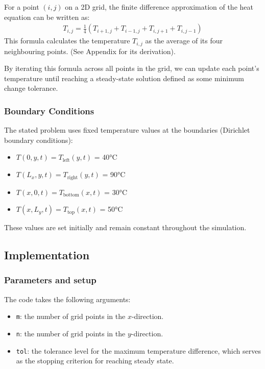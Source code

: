 \documentclass[11pt,a4paper]{article}
\begin{document}
For a point \((i, j)\) on a 2D grid,
the finite difference approximation of the heat equation can be written as:
\begin{align}
  T_{i,j} = \frac{1}{4}\left(T_{i+1,j} + T_{i-1,j} + T_{i,j+1} + T_{i,j-1}\right)
\end{align}
This formula calculates the temperature \(T_{i,j}\) as the average of
its four neighbouring points. (See Appendix for its derivation).

By iterating this formula across all points in the grid,
we can update each point's temperature until reaching a steady-state solution defined
as some minimum change tolerance.

\subsubsection{Boundary Conditions}

The stated problem uses fixed temperature
values at the boundaries (Dirichlet boundary conditions):
\begin{itemize}
  \item
        \(T(0, y, t) = T_{\text{left}}(y, t)\) = 40°C
  \item
        \(T(L_x, y, t) = T_{\text{right}}(y, t)\) = 90°C
  \item
        \(T(x, 0, t) = T_{\text{bottom}}(x, t)\) = 30°C
  \item
        \(T(x, L_y, t) = T_{\text{top}}(x, t)\) = 50°C
\end{itemize}
These values are set initially and remain constant throughout the simulation.

\newpage
\subsection{Implementation}

\subsubsection{Parameters and setup}

The code takes the following arguments:
\begin{itemize}
  \item
        \texttt{m}: the number of grid points in the \(x\)-direction.
  \item
        \texttt{n}: the number of grid points in the \(y\)-direction.
  \item
        \texttt{tol}: the tolerance level for the maximum temperature difference,
        which serves as the stopping criterion for reaching steady state.
\end{itemize}
\end{document}

